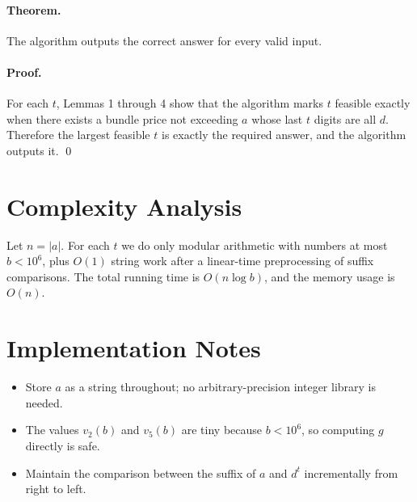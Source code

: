 \documentclass[11pt]{article}
\begin{document}
\paragraph{Theorem.}
The algorithm outputs the correct answer for every valid input.

\paragraph{Proof.}
For each $t$, Lemmas 1 through 4 show that the algorithm marks $t$ feasible exactly when there exists a
bundle price not exceeding $a$ whose last $t$ digits are all $d$. Therefore the largest feasible $t$ is exactly
the required answer, and the algorithm outputs it. \qed

\section*{Complexity Analysis}

Let $n = |a|$. For each $t$ we do only modular arithmetic with numbers at most $b < 10^6$, plus $O(1)$
string work after a linear-time preprocessing of suffix comparisons. The total running time is
$O(n \log b)$, and the memory usage is $O(n)$.

\section*{Implementation Notes}

\begin{itemize}[leftmargin=*]
    \item Store $a$ as a string throughout; no arbitrary-precision integer library is needed.
    \item The values $v_2(b)$ and $v_5(b)$ are tiny because $b < 10^6$, so computing $g$ directly is safe.
    \item Maintain the comparison between the suffix of $a$ and $d^t$ incrementally from right to left.
\end{itemize}
\end{document}
